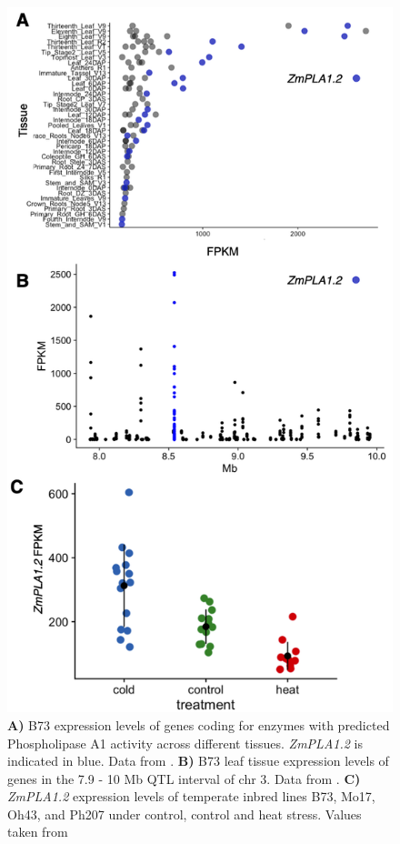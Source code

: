 \documentclass[9pt,twocolumn,twoside,lineno]{BioRxiv}
\begin{document}
\clearpage

\begin{figure}[t]
\begin{center}
\includegraphics[width=0.4\paperwidth]{Sup_Figures/Sup_Fig_4.png}
\caption{\textbf{A)} B73 expression levels of genes coding for enzymes with predicted Phospholipase A1 activity across different tissues. \textit{ZmPLA1.2} is indicated in blue. 
Data from \cite{Stelpflug2016-vr}.
\textbf{B)} B73 leaf tissue expression levels of genes in the 7.9 - 10 Mb QTL interval of chr 3. 
Data from \cite{Stelpflug2016-vr}.
\textbf{C)} \textit{ZmPLA1.2} expression levels of temperate inbred lines B73, Mo17, Oh43, and Ph207 under control, control and heat stress. Values taken from \cite{Waters2017-nat}
} 
\label{SupFig3}
\end{center}
\end{figure}  
\end{document}
